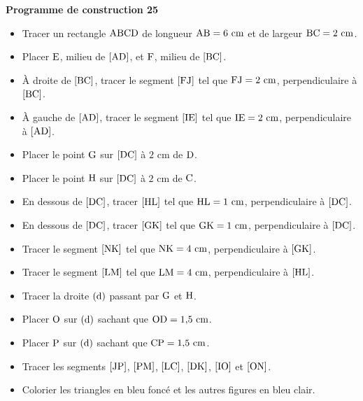 \documentclass[exercice,a4]{thedocument}%
\begin{document}
%
\noindent\textbf{Programme de construction 25}\par\smallskip\noindent
\begin{itemize}
    \item Tracer un rectangle $\text{ABCD}$ de longueur
    $\text{AB}=6\text{ cm}$ et de largeur $\text{BC}=2\text{ cm}$.
    \item Placer $\text{E}$, milieu de $[\text{AD}]$, et
    $\text{F}$, milieu de $[\text{BC}]$.
    \item À droite de $[\text{BC}]$, tracer le segment
    $[\text{FJ}]$ tel que $\text{FJ}=2\text{ cm}$,
    perpendiculaire à $[\text{BC}]$.
    \item À gauche de $[\text{AD}]$, tracer le segment
    $[\text{IE}]$ tel que $\text{IE}=2\text{ cm}$,
    perpendiculaire à $[\text{AD}]$.
    \item Placer le point $\text{G}$ sur $[\text{DC}]$ à
    $2\text{ cm}$ de $\text{D}$.
    \item Placer le point $\text{H}$ sur $[\text{DC}]$ à
    $2\text{ cm}$ de $\text{C}$.
    \item En dessous de $[\text{DC}]$, tracer $[\text{HL}]$ tel
    que $\text{HL}=1\text{ cm}$, perpendiculaire à $[\text{DC}]$.
    \item En dessous de $[\text{DC}]$, tracer $[\text{GK}]$ tel
    que $\text{GK}=1\text{ cm}$, perpendiculaire à $[\text{DC}]$.
    \item Tracer le segment $[\text{NK}]$ tel que
    $\text{NK}=4\text{ cm}$, perpendiculaire à $[\text{GK}]$.
    \item Tracer le segment $[\text{LM}]$ tel que
    $\text{LM}=4\text{ cm}$, perpendiculaire à $[\text{HL}]$.
    \item Tracer la droite $(\text{d})$ passant par
    $\text{G}$ et $\text{H}$.
    \item Placer $\text{O}$ sur $(\text{d})$ sachant que
    $\text{OD}=1{,}5\text{ cm}$.
    \item Placer $\text{P}$ sur $(\text{d})$ sachant que
    $\text{CP}=1{,}5\text{ cm}$.
    \item Tracer les segments $[\text{JP}]$, $[\text{PM}]$,
    $[\text{LC}]$, $[\text{DK}]$, $[\text{IO}]$ et
    $[\text{ON}]$.
    \item Colorier les triangles en bleu foncé et les autres figures en
    bleu clair.
\end{itemize}
\end{document}
